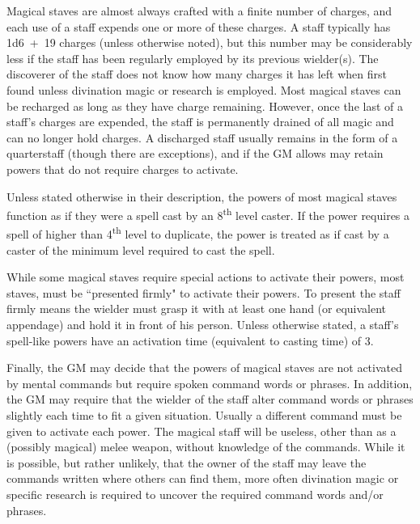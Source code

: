 \begin{multicols}{2}
Magical staves are almost always crafted with a finite number of charges, and each use of a staff expends one or more of these charges.  A staff typically has 1d6~+~19 charges (unless otherwise noted), but this number may be considerably less if the staff has been regularly employed by its previous wielder(s).  The discoverer of the staff does not know how many charges it has left when first found unless divination magic or research is employed.  Most magical staves can be recharged as long as they have charge remaining.  However, once the last of a staff's charges are expended, the staff is permanently drained of all magic and can no longer hold charges.  A discharged staff usually remains in the form of a quarterstaff (though there are exceptions), and if the GM allows may retain powers that do not require charges to activate.

Unless stated otherwise in their description, the powers of most magical staves function as if they were a spell cast by an 8\textsuperscript{th} level caster.  If the power requires a spell of higher than 4\textsuperscript{th} level to duplicate, the power is treated as if cast by a caster of the minimum level required to cast the spell.  

While some magical staves require special actions to activate their powers, most staves, must be ``presented firmly" to activate their powers.  To present the staff firmly means the wielder must grasp it with at least one hand (or equivalent appendage) and hold it in front of his person.  Unless otherwise stated, a staff's spell-like powers have an activation time (equivalent to casting time) of 3.

Finally, the GM may decide that the powers of magical staves are not activated by mental commands but require spoken command words or phrases.  In addition, the GM may require that the wielder of the staff alter command words or phrases slightly each time to fit a given situation.  Usually a different command must be given to activate each power.  The magical staff will be useless, other than as a (possibly magical) melee weapon, without knowledge of the commands.  While it is possible, but rather unlikely, that the owner of the staff may leave the commands written where others can find them, more often divination magic or specific research is required to uncover the required command words and/or phrases.


\noindent
\begin{minipage}{\columnwidth}


\end{minipage}
\end{multicols}
